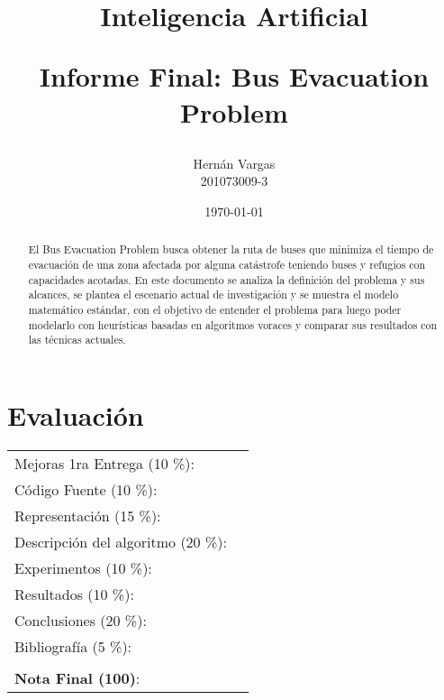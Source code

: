 \documentclass[letter, 10pt]{article}
\begin{document}
\title{
    Inteligencia Artificial \\ 
    \begin{Large}
        Informe Final: Bus Evacuation Problem
    \end{Large}
}
\author{Hernán Vargas \\ 201073009-3}
\date{\today}
\maketitle


\section*{Evaluación}

\begin{tabular}{ll}
    Mejoras 1ra Entrega (10 \%): &  \underline{\hspace{2cm}}\\
    Código Fuente (10 \%): &  \underline{\hspace{2cm}}\\
    Representación (15 \%):  & \underline{\hspace{2cm}} \\
    Descripción del algoritmo (20 \%):  & \underline{\hspace{2cm}} \\
    Experimentos (10 \%):  & \underline{\hspace{2cm}} \\
    Resultados (10 \%):  & \underline{\hspace{2cm}} \\
    Conclusiones (20 \%): &  \underline{\hspace{2cm}}\\
    Bibliografía (5 \%): & \underline{\hspace{2cm}}\\
    &  \\
    \textbf{Nota Final (100)}:   & \underline{\hspace{2cm}}
\end{tabular}

\begin{abstract}
    El Bus Evacuation Problem busca obtener la ruta de buses que minimiza el
    tiempo de evacuación de una zona afectada por alguna catástrofe teniendo
    buses y refugios con capacidades acotadas. En este documento se analiza la
    definición del problema y sus alcances, se plantea el escenario actual de
    investigación y se muestra el modelo matemático estándar, 
    con el objetivo de entender el problema para luego poder modelarlo con
    heurísticas basadas en algoritmos voraces  y comparar sus resultados con las
    técnicas actuales.
\end{abstract}
\end{document}
